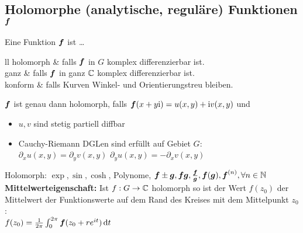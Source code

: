 \documentclass[german,color,5pt]{latex4ei/latex4ei_fs}
\begin{document}
\begin{sectionbox}
	\subsection{Holomorphe (analytische, reguläre) Funktionen $\boldsymbol{f}$}
	Eine Funktion $\boldsymbol{f}$ ist \dots
	\begin{tablebox}{ll}
		holomorph & falls $\boldsymbol{f}$ in $G$ komplex differenzierbar ist.\\
		ganz & falls $\boldsymbol{f}$ in ganz $\mathbb C$ komplex differenzierbar ist.\\
		konform & falls Kurven Winkel- und Orientierungstreu bleiben.\\

	\end{tablebox}
	$\boldsymbol{f}$ ist genau dann holomorph, falls $\boldsymbol{f}(x+y\mathrm{i}) = u(x,y) + \mathrm{i} v(x,y)$ und
	\begin{itemize}\itemsep0pt
		\item $u,v$ sind stetig partiell diffbar
		\item Cauchy-Riemann DGLen sind erfüllt auf Gebiet $G$:\\
		$\partial_x u(x,y) = \partial_y v(x,y)$ \qquad $\partial_y u(x,y) = - \partial_x v(x,y)$
	\end{itemize}
	Holomorph: $\exp, \sin, \cosh$, Polynome, $\boldsymbol{f}\pm \boldsymbol{g}, \boldsymbol{f} \boldsymbol{g}, \frac{\boldsymbol{f}}{\boldsymbol{g}}, \boldsymbol{f}(\boldsymbol{g}),\boldsymbol{f}^{(n)}, \forall n\in \mathbb{N}$ \\
	\textbf{Mittelwerteigenschaft:} Ist $f:G\rightarrow \mathbb C$ holomorph so ist der Wert $f(z_0)$ der Mittelwert der Funktionswerte auf dem Rand des Kreises mit dem Mittelpunkt $z_0$: \\
	$f(z_0)=\frac{1}{2\pi}\int_{0}^{2\pi}\cx f(z_0+r e^{it})\diff t$
\end{sectionbox}
\end{document}
